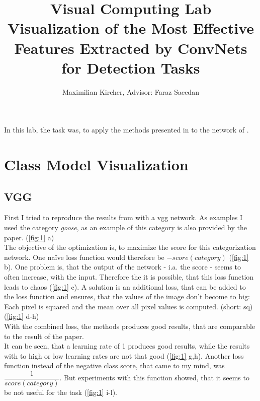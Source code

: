 \documentclass[a4paper, 10pt, deutsch]{llncs}
\begin{document}
\title{{\normalsize Visual Computing Lab} \\
  Visualization of the Most Effective Features Extracted by ConvNets for Detection Tasks}
\author{Maximilian Kircher, Advisor: Faraz Saeedan}

\maketitle

In this lab, the task was, to apply the methods presented in \cite{simonyan2013deep} to the network of \cite{liu2016ssd}.


\section{Class Model Visualization}
\subsection{VGG}

First I tried to reproduce the results from \cite{simonyan2013deep} with a vgg network. As examples I used the category \textit{goose}, as an example of this category is also provided by the paper. (\ref{fig:1} a)\\
The objective of the optimization is, to maximize the score for this categorization network. One na\"ive loss function would therefore be $-score(category)$ (\ref{fig:1} b). One problem is, that the output of the network - i.a. the score - seems to often increase, with the input. Therefore the it is possible, that this loss function leads to chaos (\ref{fig:1} c).
A solution is an additional loss, that can be added to the loss function and ensures, that the values of the image don't become to big: Each pixel is squared and the mean over all pixel values is computed. (short: sq) (\ref{fig:1} d-h)\\
With the combined loss, the methods produces good results, that are comparable to the result of the paper.\\
It can be seen, that a learning rate of 1 produces good results, while the results with to high or low learning rates are not that good (\ref{fig:1} g,h).
Another loss function instead of the negative class score, that came to my mind, was $\dfrac{1}{score(category)}$.
But experiments with this function showed, that it seems to be not useful for the task (\ref{fig:1} i-l).
\end{document}
